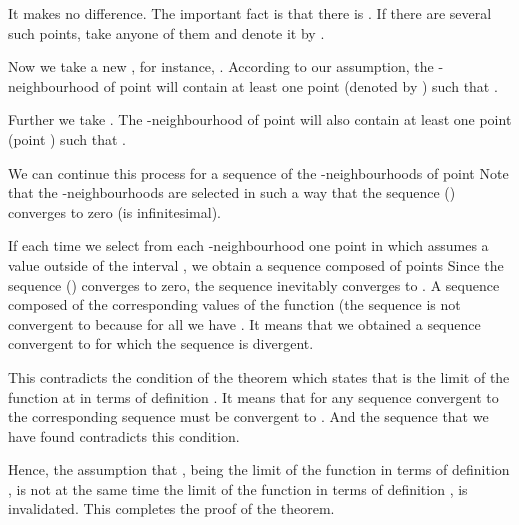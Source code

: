 \begin{p}
It makes no difference. The important fact is that there is . If there are several such points, take anyone of them and denote it by .

Now we take a new \hlm{$\delta$}, for instance, . According to our assumption, the -neighbourhood of point  will contain at least one point  (denoted by ) such that .

Further we take . The -neighbourhood of point  will also contain at least one point  (point ) such that .

We can continue this process for a sequence of the \hlm{$\delta$}-neighbourhoods of point  
Note that the \hlm{$\delta$}-neighbourhoods are selected in such a way that the sequence () converges to zero (is infinitesimal).

If each time we select from each \hlm{$\delta$}-neighbourhood one point  in which  assumes a value outside of the interval \hlm{$]b - \varepsilon', \, b + \varepsilon'[$}, we obtain a sequence composed of points
Since the sequence () converges to zero, the sequence  inevitably converges to . A sequence composed of the corresponding values of the function (the sequence \hlm{$[f (x_{n})]$} is not convergent to  because for all  we have . It means that we obtained a sequence  convergent to  for which the sequence \hlm{$[f (x_{n})]$} is divergent.

This contradicts the condition of the theorem which states that  is the limit of the function at  in terms of definition . It means that for any sequence  convergent to  the corresponding sequence \hlm{$[f (x_{n})$} must be convergent to . And the sequence  that we have found contradicts this condition.

Hence, the assumption that , being the limit of the function in terms of definition , is not at the same time the limit of the function in terms of definition , is invalidated. This completes the proof of the theorem.
\end{p}

